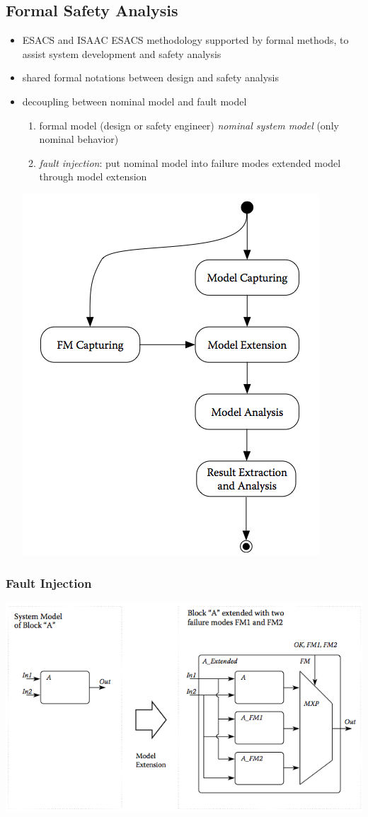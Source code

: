 \documentclass[a4paper, 10pt]{article}
\begin{document}
\subsection*{Formal Safety Analysis}
\begin{itemize}
    \item ESACS and ISAAC \follows ESACS methodology supported by formal methods, to assist system development and safety analysis
    \item shared formal notations between design and safety analysis
    \item decoupling between nominal model and fault model
    \begin{enumerate}
        \item formal model (design or safety engineer) \follows \emph{nominal system model} (only nominal behavior)
        \item \emph{fault injection}: put nominal model into failure modes \follows extended model through model extension
    \end{enumerate}
    \begin{center}
        \includegraphics[width=.5\linewidth]{images/esacs.png}
    \end{center}
\end{itemize}

\subsubsection*{Fault Injection}
\begin{center}
    \includegraphics[width=\linewidth]{images/faultinjection.png}
\end{center}
\end{document}
